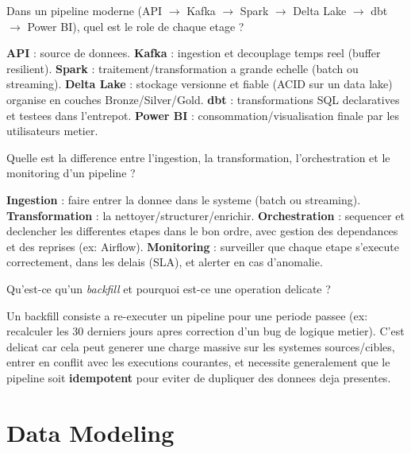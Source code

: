 \documentclass[11pt,a4paper]{article}
\begin{document}
\begin{question} Dans un pipeline moderne (API $\to$ Kafka $\to$ Spark $\to$ Delta Lake $\to$ dbt $\to$ Power BI), quel est le role de chaque etage ?
\end{question}
\begin{reponse}
\textbf{API} : source de donnees. \textbf{Kafka} : ingestion et decouplage temps reel (buffer resilient). \textbf{Spark} : traitement/transformation a grande echelle (batch ou streaming). \textbf{Delta Lake} : stockage versionne et fiable (ACID sur un data lake) organise en couches Bronze/Silver/Gold. \textbf{dbt} : transformations SQL declaratives et testees dans l'entrepot. \textbf{Power BI} : consommation/visualisation finale par les utilisateurs metier.
\end{reponse}

\begin{question} Quelle est la difference entre l'ingestion, la transformation, l'orchestration et le monitoring d'un pipeline ?
\end{question}
\begin{reponse}
\textbf{Ingestion} : faire entrer la donnee dans le systeme (batch ou streaming). \textbf{Transformation} : la nettoyer/structurer/enrichir. \textbf{Orchestration} : sequencer et declencher les differentes etapes dans le bon ordre, avec gestion des dependances et des reprises (ex: Airflow). \textbf{Monitoring} : surveiller que chaque etape s'execute correctement, dans les delais (SLA), et alerter en cas d'anomalie.
\end{reponse}

\begin{question} Qu'est-ce qu'un \emph{backfill} et pourquoi est-ce une operation delicate ?
\end{question}
\begin{reponse}
Un backfill consiste a re-executer un pipeline pour une periode passee (ex: recalculer les 30 derniers jours apres correction d'un bug de logique metier). C'est delicat car cela peut generer une charge massive sur les systemes sources/cibles, entrer en conflit avec les executions courantes, et necessite generalement que le pipeline soit \textbf{idempotent} pour eviter de dupliquer des donnees deja presentes.
\end{reponse}

\newpage
\section{Data Modeling}
\end{document}
